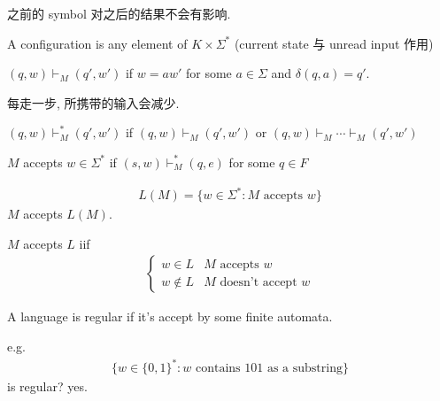 之前的 symbol 对之后的结果不会有影响.

\begin{definition}[configuration]
    A configuration is any element of $K\times \Sigma^*$
    (current state 与 unread input 作用)
\end{definition}

\begin{definition}
    $(q,w)\vdash_M (q', w')$ if $w=aw'$ for some $a\in \Sigma$ and $\delta(q, a)=q'$. 
\end{definition}
每走一步, 所携带的输入会减少. 

\begin{definition}[yields]
    $(q,w)\vdash_M^* (q', w')$ if $(q,w)\vdash_M(q', w')$ or $(q,w)\vdash_M\cdots \vdash_M(q', w')$
\end{definition}


\begin{definition}
    $M$ accepts $w\in \Sigma^*$ if $(s,w)\vdash_M^*(q,e)$ for some $q\in F$
\end{definition}

\begin{definition}
    \begin{align*}
        L(M)=\{ w\in \Sigma^*: M\text{ accepts }w \}
    \end{align*}
    $M$ accepts $L(M)$. 
\end{definition}

$M$ accepts $L$ iif
\begin{align*}
    \left\{ \begin{array}{ll}
        w\in L & M\text{ accepts }w\\
        w\notin L & M\text{ doesn't accept }w
    \end{array} \right.
\end{align*}

\begin{definition}
    A language is regular if it's accept by some finite automata. 
\end{definition}

e.g. 
\begin{align*}
    \{ w\in\{ 0,1 \}^*: w \text{ contains $101$ as a substring}\}
\end{align*} is regular? yes.


